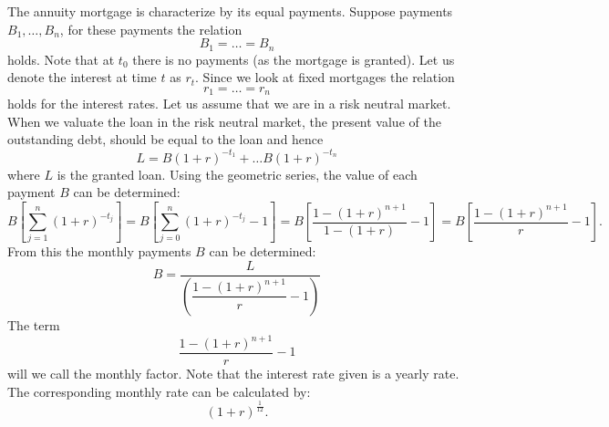 The annuity mortgage is characterize by its equal payments. 
Suppose payments $B_1, \ldots, B_n$, for these payments the relation
\begin{equation}
    B_1 = \ldots = B_n 
\end{equation}
holds. Note that at $t_0$ there is no payments (as the mortgage is granted).
Let us denote the interest at time $t$ as $r_t$. Since we look at fixed mortgages 
the relation
\begin{equation}
    r_1 = \ldots = r_n
\end{equation}
holds for the interest rates. 
Let us assume that we are in a risk neutral market. When we valuate the loan in the risk 
neutral market, the present value of the outstanding debt, should be equal to the loan
and hence
\begin{equation}
    L = B (1 + r)^{-t_1} + \ldots B (1 + r)^{-t_n}
\end{equation}
where $L$ is the granted loan. Using the geometric series, the value of each payment 
$B$ can be determined: 
\begin{equation}
    B\left[
        \displaystyle\sum_{j=1}^{n} (1 + r)^{-t_j}  
    \right] = 
    B\left[
        \displaystyle\sum_{j=0}^{n} (1 + r)^{-t_j} - 1  
    \right] = 
    B \left[
        \dfrac{1 - (1 + r)^{n+1}}{1 - (1 + r)} - 1
    \right] =
    B \left[
        \dfrac{1 - (1 + r)^{n+1}}{r}  - 1
    \right].
\end{equation}
From this the monthly payments $B$ can be determined: 
\begin{equation}
    B = \dfrac{L}{
        \left(
            \dfrac{1 - (1 + r)^{n+1}}{r} - 1
        \right)
    }
\end{equation}
The term 
\begin{equation}
    \dfrac{1 - (1 + r)^{n+1}}{r} - 1        
\end{equation}
will we call the monthly factor. Note that the interest rate given is a yearly rate. The 
corresponding monthly rate can be calculated by: 
\begin{equation}
    (1 + r)^{\frac{1}{12}}.
\end{equation} 